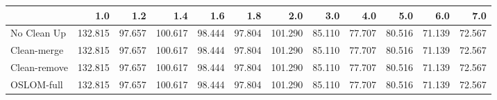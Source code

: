 \begin{tabular}{lrrrrrrrrrrr}
\toprule
{} &     1.0 &    1.2 &     1.4 &    1.6 &    1.8 &     2.0 &    3.0 &    4.0 &    5.0 &    6.0 &    7.0 \\
\midrule
No Clean Up  & 132.815 & 97.657 & 100.617 & 98.444 & 97.804 & 101.290 & 85.110 & 77.707 & 80.516 & 71.139 & 72.567 \\
Clean-merge  & 132.815 & 97.657 & 100.617 & 98.444 & 97.804 & 101.290 & 85.110 & 77.707 & 80.516 & 71.139 & 72.567 \\
Clean-remove & 132.815 & 97.657 & 100.617 & 98.444 & 97.804 & 101.290 & 85.110 & 77.707 & 80.516 & 71.139 & 72.567 \\
OSLOM-full   & 132.815 & 97.657 & 100.617 & 98.444 & 97.804 & 101.290 & 85.110 & 77.707 & 80.516 & 71.139 & 72.567 \\
\bottomrule
\end{tabular}
